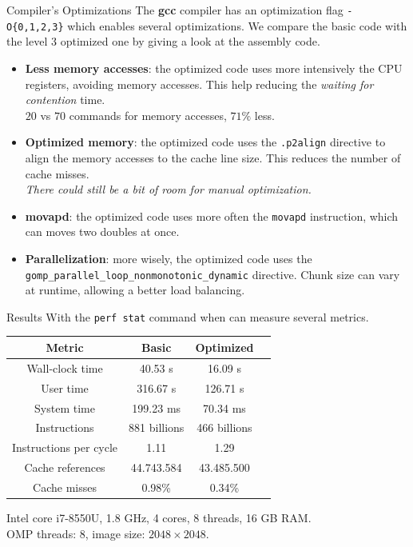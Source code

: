 %
%
\begin{frame}[fragile,t]{Compiler's Optimizations}
    The \textbf{gcc} compiler has an optimization flag \texttt{-O\{0,1,2,3\}} which
    enables several optimizations. We compare the basic code with the
    level 3 optimized one by giving a look at the assembly code. \\
    \begin{itemize}
        \item \textbf{Less memory accesses}: the optimized code uses more intensively
        the CPU registers, avoiding memory accesses. This help reducing the
        \textit{waiting for contention} time. \\
        $20$ vs $70$ commands for memory accesses, $71\%$ less.
        \item \textbf{Optimized memory}: the optimized code uses the \texttt{.p2align}
        directive to align the memory accesses to the cache line size. This
        reduces the number of cache misses. \\
        \small\textit{There could still be a bit of room for manual optimization.}
        \item \textbf{movapd}: the optimized code uses more often the \texttt{movapd}
        instruction, which can moves two doubles at once.
        \item \textbf{Parallelization}: more wisely, the optimized code uses
        the \texttt{gomp\_parallel\_loop\_nonmonotonic\_dynamic} directive.
        Chunk size can vary at runtime, allowing a better load balancing.
    \end{itemize}
\end{frame}

%
%
\begin{frame}[fragile,t]{Results}
    With the \texttt{perf stat} command when can measure several metrics. \\ 
    \begin{table}[H]
        \centering
        \begin{tabular}{cccc}
            \toprule
            \textbf{Metric} & \textbf{Basic} & \textbf{Optimized}\\
            \midrule
            Wall-clock time & 40.53 s & 16.09 s \\
            User time & 316.67 s & 126.71 s \\
            System time & 199.23 ms & 70.34 ms \\
            \hline
            Instructions & 881 billions & 466 billions \\
            Instructions per cycle & 1.11 & 1.29 \\
            \hline
            Cache references & 44.743.584 & 43.485.500 \\
            Cache misses & 0.98\% & 0.34\% \\
            \bottomrule
        \end{tabular}
    \end{table}
    \vfill
    Intel core i7-8550U, 1.8 GHz, 4 cores, 8 threads, 16 GB RAM. \\
    OMP threads: $8$, image size: $2048 \times 2048$.
\end{frame}

